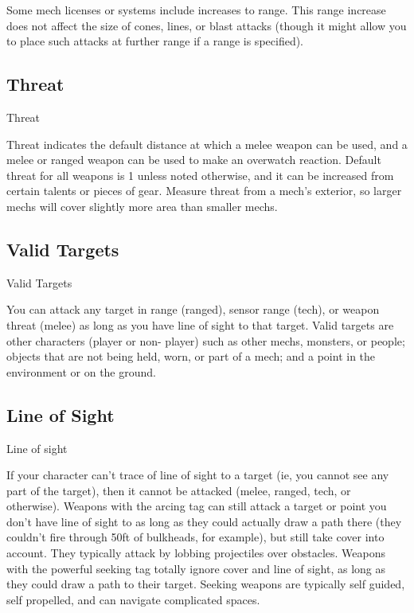 Some mech licenses or systems include increases to range. This range increase does not affect  
the size of cones, lines, or blast attacks (though it might allow you to place such attacks at further  
range if a range is specified).  
\subsection{Threat}
                                                     Threat  

Threat indicates the default distance at which a melee weapon can be used, and a melee or  
ranged weapon can be used to make an overwatch reaction. Default threat for all weapons is 1  
unless noted otherwise, and it can be increased from certain talents or pieces of gear. Measure  
threat from a mech’s exterior, so larger mechs will cover slightly more area than smaller mechs.  
\subsection{Valid Targets}
                                                Valid Targets  

You can attack any target in range (ranged), sensor range (tech), or weapon threat (melee) as  
long as you have line of sight to that target. Valid targets are other characters (player or non- 
player) such as other mechs, monsters, or people; objects that are not being held, worn, or part of  
a mech; and a point in the environment or on the ground.  
\subsection{Line of Sight}
                                                Line of sight  

If your character can’t trace of line of sight to a target (ie, you cannot see any part of the target),  
then it cannot be attacked (melee, ranged, tech, or otherwise). Weapons with the arcing tag can  
still attack a target or point you don’t have line of sight to as long as they could actually draw a  
path there (they couldn’t fire through 50ft of bulkheads, for example), but still take cover into  
account. They typically attack by lobbing projectiles over obstacles. Weapons with the powerful  
seeking tag totally ignore cover and line of sight, as long as they could draw a path to their  
target. Seeking weapons are typically self guided, self propelled, and can navigate complicated  
spaces.
 

